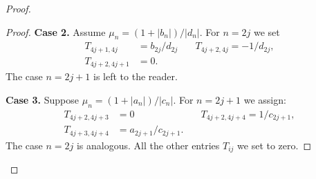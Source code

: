 \documentclass[12pt]{amsart}
\theoremstyle{case}
\begin{document}
\begin{proof}
\begin{proof}
        \noindent\textbf{Case 2.} Assume $\mu_n = (1 + |b_n|)/|d_n|$. 
        For $n=2j$ we set
        \begin{align*}
          T_{4j+1,4j} &= b_{2j}/d_{2j} & \quad T_{4j+2,4j} = -1/d_{2j},\\
          T_{4j+2,4j+1} &= 0.
        \end{align*}
        The case $n = 2j + 1$ is left to the reader.

        \noindent\textbf{Case 3.} Suppose $\mu_n = (1 + |a_n|)/|c_n|$. 
        For $n = 2j + 1$ we assign:
        \begin{align*}
          T_{4j+2,4j+3} &= 0 & \quad T_{4j+2,4j+4} = 1/c_{2j+1},\\
          T_{4j+3,4j+4} &= a_{2j+1}/c_{2j+1}.
        \end{align*}
        The case $n = 2j$ is analogous.
        All the other entries $T_{ij}$ we set to zero.


\end{proof}
\end{proof}
\end{document}
